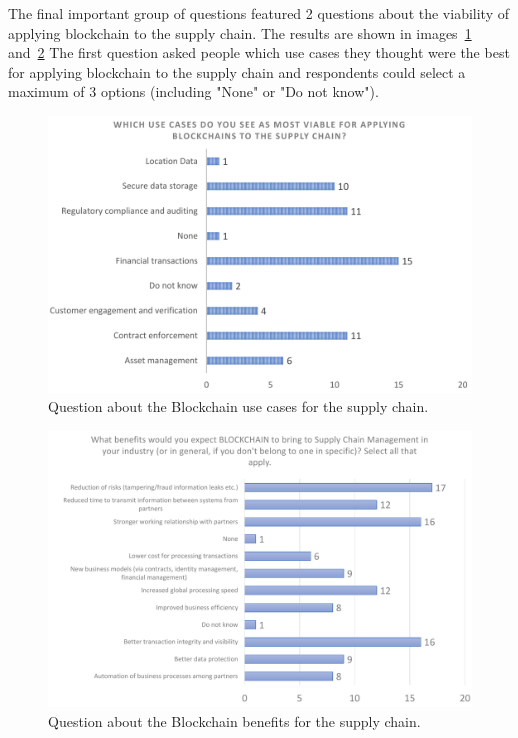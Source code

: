 
The final important group of questions featured 2 questions about the viability of applying blockchain to the supply chain. The results are shown in images~\ref{fig:blockchain_use_cases} and~\ref{fig:blockchain_benefits} The first question asked people which use cases they thought were the best for applying blockchain to the supply chain and respondents could select a maximum of 3 options (including "None" or "Do not know").

\begin{figure}[h]
    \centering
    \includegraphics[scale=0.60]{media/survey_group4/blockchain_usecases_sc.pdf}
    \caption{Question about the Blockchain use cases for the supply chain.}
    \label{fig:blockchain_use_cases}
\end{figure}

\begin{figure}[h]
    \centering
    \includegraphics[scale=0.60]{media/survey_group4/blockchain_application_benefits.pdf}
    \caption{Question about the Blockchain benefits for the supply chain.}
    \label{fig:blockchain_benefits}
    \end{figure}

